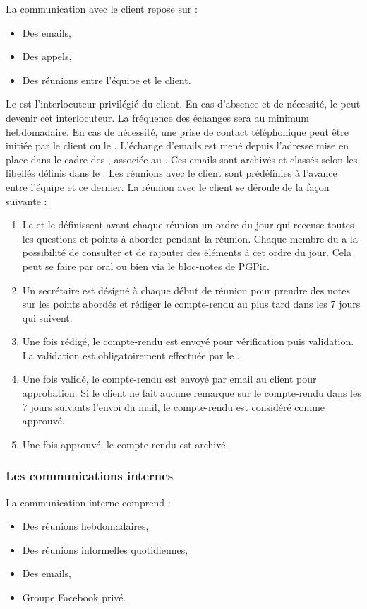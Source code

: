 La communication avec le client repose sur : 
\begin{itemize}
\item Des emails,
\item Des appels,
\item Des réunions entre l'équipe et le client. \\
\end{itemize}

Le \CP{} est l’interlocuteur privilégié du client. En cas d’absence et de nécessité, le \CPA{} peut devenir cet interlocuteur. La fréquence des échanges sera au minimum hebdomadaire. En cas de nécessité, une prise de contact téléphonique peut être initiée par
le client ou le \CP. L’échange d’emails est mené depuis l’adresse mise en place dans le cadre des \PICCourt, associée au \CP. Ces emails sont archivés et classés selon les libellés définis dans le \PGC. Les réunions avec le client sont prédéfinies à l’avance entre l’équipe \PICCourt et ce dernier. La réunion avec le client se déroule de la façon suivante :
\begin{enumerate}
\item Le \CP{} et le \CPA{} définissent avant chaque réunion un ordre du jour qui recense toutes les questions et points à aborder pendant la réunion. Chaque membre du \PICCourt a la possibilité de consulter et de rajouter des éléments à cet ordre du jour. Cela peut se faire par oral ou bien via le bloc-notes de PGPic.
\item Un secrétaire est désigné à chaque début de réunion pour prendre des notes sur les points abordés et rédiger le compte-rendu au plus tard dans les 7 jours qui suivent.
\item Une fois rédigé, le compte-rendu est envoyé pour vérification puis validation. La validation est obligatoirement effectuée par le \CP.
\item Une fois validé, le compte-rendu est envoyé par email au client pour approbation. Si le client ne fait aucune remarque sur le compte-rendu dans les 7 jours suivants l’envoi du mail, le compte-rendu est considéré comme approuvé.
\item Une fois approuvé, le compte-rendu est archivé.
\end{enumerate}


\subsubsection*{Les communications internes}

La communication interne comprend :
\begin{itemize}
\item Des réunions hebdomadaires,
\item Des réunions informelles quotidiennes, 
\item Des emails,
\item Groupe Facebook privé. \\
\end{itemize}

